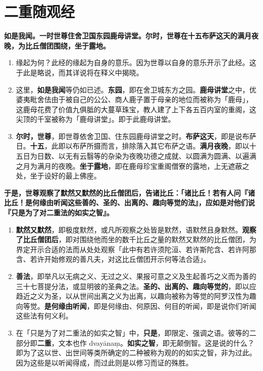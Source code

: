 \section{二重随观经}

\textbf{如是我闻。一时世尊住舍卫国东园鹿母讲堂。尔时，世尊在十五布萨这天的满月夜晚，为比丘僧团围绕，坐于露地。}

\begin{enumerate}\item 缘起为何？此经的缘起为自身的意乐。因为世尊以自身的意乐开示了此经。这于此是略说，而其详说将在释义中揭晓。
\item 这里，\textbf{如是我闻}等仍如已述。\textbf{东园}，即在舍卫城东方之园。\textbf{鹿母讲堂}之中，优婆夷毗舍佉由于被自己的公公、商人鹿子置于母亲的地位而被称为「鹿母」，这鹿母花费了价值九俱胝的大蔓草珠宝，教人建了上下各五百内室的重阁，这尖顶的千室被称为「鹿母讲堂」。即于此鹿母讲堂。
\item \textbf{尔时，世尊}，即世尊依舍卫国、住东园鹿母讲堂之时。\textbf{布萨这天}，即是说布萨日。\textbf{十五}，此即以布萨所摄而言，排除落入其它布萨之语。\textbf{满月夜晚}，即以十五日为日数、以无有云翳等的杂染为夜晚功德之成就、以圆满为圆满、以遍满之月为满月的夜晚。\textbf{坐于露地}，即在鹿母珍宝重阁僧寮的露地，上无遮蔽之处，坐于设好的最上佛座。\end{enumerate}

\textbf{于是，世尊观察了默然又默然的比丘僧团后，告诸比丘：「诸比丘！若有人问『诸比丘！是何缘由听闻这些善的、圣的、出离的、趣向等觉的法』，应如是对他们说『只是为了对二重法的如实之智』。}

\begin{enumerate}\item \textbf{默然又默然}，即极度默然，或凡所观察之处皆是默然，语默然且身默然。\textbf{观察了比丘僧团后}，即对围绕他而坐的数千比丘之量的默然又默然的比丘僧团，为界定开示合适的法而从处处观察「此中有若许须陀洹、若许斯陀含、若许阿那含、若许开始修观的善凡夫，对这比丘僧团开示何等法合适」。
\item \textbf{善法}，即举凡以无病之义、无过之义、果报可意之义及生起善巧之义而为善的三十七菩提分法，或显明彼的圣典之法。\textbf{圣的、出离的、趣向等觉的}，即以应趋近之义为圣，以从世间出离之义为出离，以趣向被称为等觉的阿罗汉性为趣向等觉。\textbf{是何缘由听闻}，即是何缘由、何原因、何目的听闻，即是说你们听闻这些法有何义利。
\item 在「只是为了对二重法的如实之智」中，\textbf{只是}，即限定、强调之语。彼等的二部分即\textbf{二重}，文本也作 dvayānaṃ。\textbf{如实之智}，即无颠倒智。这是说的什么？即为了这以世、出世间等类所确定的二种被称为观的的如实之智，非为过此。因为这些是以听闻得成，而过此则是以修习而证的殊胜。\end{enumerate}

